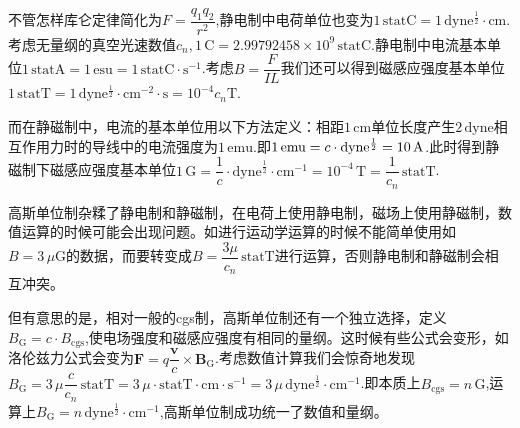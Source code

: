 \documentclass[../天体物理基础.tex]{subfiles}
\begin{document}
不管怎样库仑定律简化为$F=\dfrac{q_{1}q_{2}}{r^{2}}$,静电制中电荷单位也变为$1\,\mathrm{statC}=1\,\mathrm{dyne^{\frac12}\cdot cm}$.考虑无量纲的真空光速数值$c_{n},1\,\mathrm{C}=2.99792458\times10^{9}\,\mathrm{statC}$.静电制中电流基本单位$1\,\mathrm{statA}=1\,\mathrm{esu}=1\,\mathrm{statC\cdot{}s^{-1}}$.考虑$B=\dfrac{F}{IL}$我们还可以得到磁感应强度基本单位$1\,\mathrm{statT}=1\,\mathrm{dyne^{\frac{1}{2}}\cdot cm^{-2}\cdot s}=10^{-4}c_{n}\mathrm{T}$.

而在静磁制中，电流的基本单位用以下方法定义：相距$1\,\mathrm{cm}$单位长度产生$2\,\mathrm{dyne}$相互作用力时的导线中的电流强度为$1\,\mathrm{emu}$.即$1\,\mathrm{emu}=c\cdot\rm dyne^{\frac12}=10\,\mathrm{A}$.此时得到静磁制下磁感应强度基本单位$1\,\mathrm{G}=\dfrac{1}{c}\cdot\mathrm{dyne}^{\frac12}\cdot\mathrm{cm}^{-1}=10^{-4}\,\mathrm{T}=\dfrac1{c_{n}}\,\mathrm{statT}$.

高斯单位制杂糅了静电制和静磁制，在电荷上使用静电制，磁场上使用静磁制，数值运算的时候可能会出现问题。如进行运动学运算的时候不能简单使用如$B=3\,\mu\mathrm{G}$的数据，而要转变成$B=\dfrac{3\mu}{c_{n}}\,\mathrm{statT}$进行运算，否则静电制和静磁制会相互冲突。

但有意思的是，相对一般的cgs制，高斯单位制还有一个独立选择，定义$B_{\text{G}}=c\cdot B_{\text{cgs}}$,使电场强度和磁感应强度有相同的量纲。这时候有些公式会变形，如洛伦兹力公式会变为$\boldsymbol{F}=q\dfrac{\boldsymbol{v}}c\times\boldsymbol{B}_{\text{G}}$.考虑数值计算我们会惊奇地发现$B_{\text{G}}=3\,\mu\dfrac{c}{c_{n}}\,\mathrm{statT}=3\,\mu\cdot\mathrm{statT}\cdot\mathrm{cm\cdot{}s^{-1}}=3\,\mu\,\mathrm{dyne^{\frac{1}{2}}}\cdot\mathrm{cm}^{-1}$.即本质上$B_{\text{cgs}}=n\,\mathrm{G}$,运算上$B_{\text{G}}=n\,\mathrm{dyne^{\frac{1}{2}}\cdot cm^{-1}}$,高斯单位制成功统一了数值和量纲。
\end{document}
